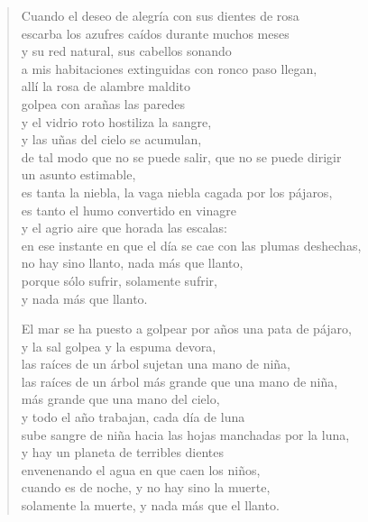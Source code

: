 \documentclass[12pt]{article}
\begin{document}
\clearpage
{}
\begin{verse}

Cuando el deseo de alegría con sus dientes de rosa\\
escarba los azufres caídos durante muchos meses\\
y su red natural, sus cabellos sonando\\
a mis habitaciones extinguidas con ronco paso llegan,\\
allí la rosa de alambre maldito\\
golpea con arañas las paredes\\
y el vidrio roto hostiliza la sangre,\\
y las uñas del cielo se acumulan,\\
de tal modo que no se puede salir, que no se puede dirigir\\
un asunto estimable,\\
es tanta la niebla, la vaga niebla cagada por los pájaros,\\
es tanto el humo convertido en vinagre\\
y el agrio aire que horada las escalas:\\
en ese instante en que el día se cae con las plumas deshechas,\\
no hay sino llanto, nada más que llanto,\\
porque sólo sufrir, solamente sufrir,\\
y nada más que llanto.  

El mar se ha puesto a golpear por años una pata de pájaro,\\
y la sal golpea y la espuma devora,\\
las raíces de un árbol sujetan una mano de niña,\\
las raíces de un árbol más grande que una mano de niña,\\
más grande que una mano del cielo,\\
y todo el año trabajan, cada día de luna\\
sube sangre de niña hacia las hojas manchadas por la luna,\\
y hay un planeta de terribles dientes\\
envenenando el agua en que caen los niños,\\
cuando es de noche, y no hay sino la muerte,\\
solamente la muerte, y nada más que el llanto.  


\end{verse}
\end{document}
